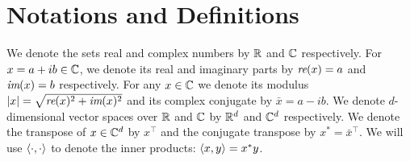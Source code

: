 \section{Notations and Definitions}\label{sec:def}
We denote the sets real and complex numbers by $\mathbb{R}$ and $\mathbb{C}$ respectively. For $x=a+ib\in \mathbb{C}$, we denote its real and imaginary parts by $\emph{re}(x)=a$ and $\emph{im}(x)=b$ respectively.
For any $x\in \mathbb{C}$ we denote its modulus $\left|x\right|=\sqrt{\emph{re}(x)^2+\emph{im}(x)^2}$ and its complex conjugate by $\bar{x}=a-ib$.
We denote $d$-dimensional vector spaces over $\mathbb{R}$ and $\mathbb{C}$ by $\mathbb{R}^{d}$ and $\mathbb{C}^{d}$ respectively.
We denote the transpose of $x\in \mathbb{C}^{d}$ by $x^\top$ and the conjugate transpose by $x^*={\bar{x}}^\top$.
We will use $\langle\cdot,\cdot\rangle$ to denote the inner products: $\langle x,y\rangle=x^* y$.


